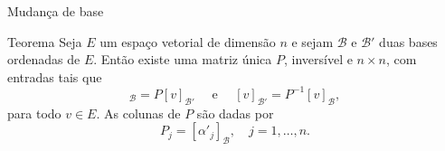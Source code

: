 \documentclass{beamer}
\begin{document}
\begin{darkframes}
\begin{frame}{Mudança de base}
  \begin{block}{Teorema}
    Seja $E$ um espaço vetorial de dimensão $n$ e sejam ${\mathcal{B}}$ e ${\mathcal{B}}'$ duas bases ordenadas de $E$. Então existe uma matriz única $P$, inversível e $n\times n$, com entradas tais que
    \begin{equation*}
      [v]_{\mathcal{B}} = P[v]_{{\mathcal{B}}'} \quad \mbox{ e } \quad [v]_{{\mathcal{B}}'}=P^{-1}[v]_{\mathcal{B}},
    \end{equation*}
    para todo $v\in E$. As colunas de $P$ são dadas por 
    \begin{equation*}
      P_j = [\alpha'_j]_{\mathcal{B}}, \quad j = 1,\ldots,n.
    \end{equation*}
  \end{block}
\end{frame}


\end{darkframes}
\end{document}

